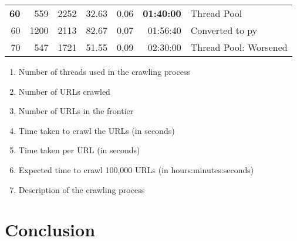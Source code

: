 \begin{table}[!ht]
\begin{tabular}{rrrrrrl}
    \textbf{60}  & 559          & 2252         & 32.63        & 0,06         & \textbf{01:40:00} & Thread Pool              \\
    60           & 1200         & 2113         & 82.67        & 0,07         & 01:56:40          & Converted to py          \\
    70           & 547          & 1721         & 51.55        & 0,09         & 02:30:00          & Thread Pool: Worsened    \\
  \end{tabular}
\end{table}

\begin{enumerate}
  \item Number of threads used in the crawling process
  \item Number of URLs crawled
  \item Number of URLs in the frontier
  \item Time taken to crawl the URLs (in seconds)
  \item Time taken per URL (in seconds)
  \item Expected time to crawl 100,000 URLs (in hours:minutes:seconds)
  \item Description of the crawling process
\end{enumerate}


\section{Conclusion}




